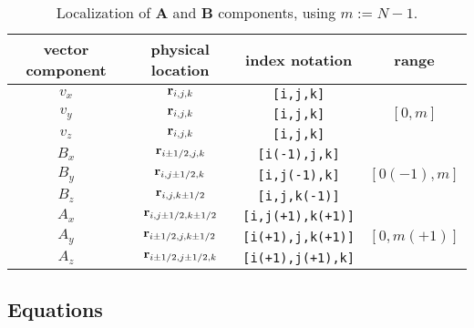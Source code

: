 \begin{table}[!hb]
  \begin{center}
    \begin{tabular}{c|c|c|c}
      vector component & physical location & index notation & range \\
      \hline
      $v_x$ & ${\bf r}_{i,j,k}$ & {\tt [i,j,k]} & \\
      $v_y$ & ${\bf r}_{i,j,k}$ & {\tt [i,j,k]} & $[0,m]$\\
      $v_z$ & ${\bf r}_{i,j,k}$ & {\tt [i,j,k]} & \\
      \hline
      $B_x$ & ${\bf r}_{i\pm 1/2,j,k}$ & {\tt [i(-1),j,k]} & \\
      $B_y$ & ${\bf r}_{i,j\pm 1/2,k}$ & {\tt [i,j(-1),k]} & $[0(-1),m]$\\
      $B_z$ & ${\bf r}_{i,j,k\pm 1/2}$ & {\tt [i,j,k(-1)]} & \\
      \hline
      $A_x$ & ${\bf r}_{i,j\pm 1/2,k\pm 1/2}$ & {\tt [i,j(+1),k(+1)]} & \\
      $A_y$ & ${\bf r}_{i\pm 1/2,j,k\pm 1/2}$ & {\tt [i(+1),j,k(+1)]} &
      $[0,m(+1)]$ \\
      $A_z$ & ${\bf r}_{i\pm 1/2,j\pm 1/2,k}$ & {\tt [i(+1),j(+1),k]} & \\
      \hline
    \end{tabular}
    \caption{ \label{tab:ab_comp}
      Localization of {\bf A} and {\bf B} components, using $m:= N-1$.}
  \end{center}
\end{table}

\subsection{Equations}

